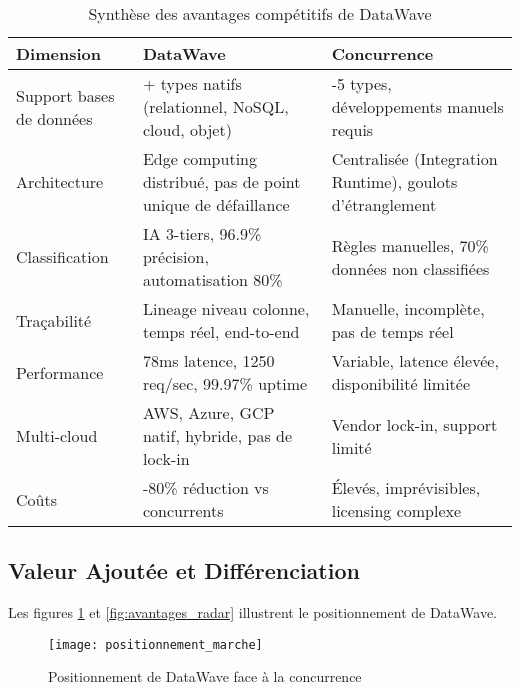 \begin{table}[htpb]
\centering
\caption{Synthèse des avantages compétitifs de DataWave}
\label{tab:avantages_datawave}
\renewcommand{\arraystretch}{1.3}
\setlength{\tabcolsep}{8pt}
\small
\begin{tabularx}{\textwidth}{>{\RaggedRight\arraybackslash}X>{\RaggedRight\arraybackslash}X>{\RaggedRight\arraybackslash}X}
\toprule
\textbf{Dimension} & \textbf{DataWave} & \textbf{Concurrence} \\
\midrule
Support bases de données & 15+ types natifs (relationnel, NoSQL, cloud, objet) & 3-5 types, développements manuels requis \\
\addlinespace
Architecture & Edge computing distribué, pas de point unique de défaillance & Centralisée (Integration Runtime), goulots d'étranglement \\
\addlinespace
Classification & IA 3-tiers, 96.9\% précision, automatisation 80\% & Règles manuelles, 70\% données non classifiées \\
\addlinespace
Traçabilité & Lineage niveau colonne, temps réel, end-to-end & Manuelle, incomplète, pas de temps réel \\
\addlinespace
Performance & 78ms latence, 1250 req/sec, 99.97\% uptime & Variable, latence élevée, disponibilité limitée \\
\addlinespace
Multi-cloud & AWS, Azure, GCP natif, hybride, pas de lock-in & Vendor lock-in, support limité \\
\addlinespace
Coûts & 60-80\% réduction vs concurrents & Élevés, imprévisibles, licensing complexe \\
\bottomrule
\end{tabularx}
\end{table}

\subsection{Valeur Ajoutée et Différenciation}

Les figures \ref{fig:positionnement_marche} et \ref{fig:avantages_radar} illustrent le positionnement de DataWave.

\begin{figure}[htpb]
\centering
\texttt{[image: positionnement\_marche]}
\caption{Positionnement de DataWave face à la concurrence}
\label{fig:positionnement_marche}
\end{figure}

